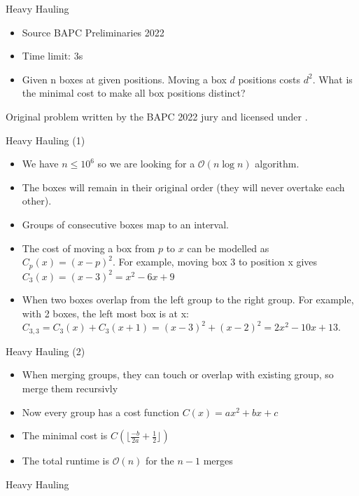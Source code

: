 \documentclass[11pt,pdf, aspectratio=169]{beamer}
\begin{document}
  \begin{frame}{Heavy Hauling}
    \begin{itemize}
      \item Source BAPC Preliminaries 2022
      \item Time limit: 3s
      \item Given n boxes at given positions.
      Moving a box $d$ positions costs $d^2$.
      What is the minimal cost to make all box positions distinct?
    \end{itemize}
    Original problem written by the BAPC 2022 jury and licensed under \doclicenseLongNameRef.

    \doclicenseImage
  \end{frame}
  \begin{frame}{Heavy Hauling (1)}
    \begin{itemize}
      \item We have $n \leq 10^6$ so we are looking for a $\mathcal{O}(n \log n)$ algorithm.
      \item The boxes will remain in their original order (they will never overtake each other).
      \item Groups of consecutive boxes map to an interval.
      \item The cost of moving a box from $p$ to $x$ can be modelled as $C_p(x)  = (x-p)^2$.
      For example, moving box 3 to position x gives $C_3(x)=(x-3)^2 = x^2 - 6x +9$
      \item When two boxes overlap from the left group to the right group.
      For example, with 2 boxes, the left most box is at x: $C_{3,3}=C_3(x)+C_3(x+1)= (x-3)^2+(x-2)^2=2x^2-10x+13$.
    \end{itemize}
  \end{frame}
  \begin{frame}{Heavy Hauling (2)}
    \begin{itemize}
      \item When merging groups, they can touch or overlap with existing group, so merge them recursivly
      \item Now every group has a cost function $C(x)=ax^2+bx+c$
      \item The minimal cost is $C\left( \lfloor \frac{-b}{2a}+\frac{1}{2}\rfloor \right)$
      \item The total runtime is $\mathcal{O}(n)$ for the $n-1$ merges
    \end{itemize}
  \end{frame}
  \begin{frame}[containsverbatim]{Heavy Hauling}
    \inputminted[fontsize=\tiny]{python}{code/session-4/dapc-h.py}
  \end{frame}
\end{document}
